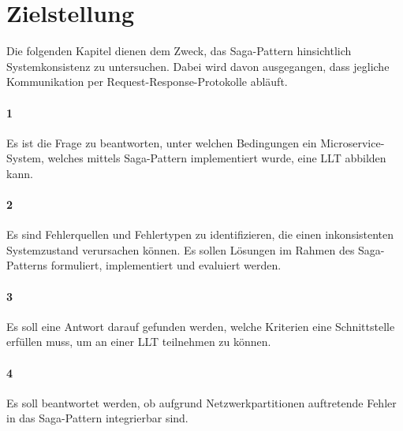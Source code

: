 
\section{Zielstellung}

Die folgenden Kapitel dienen dem Zweck, das Saga-Pattern hinsichtlich Systemkonsistenz zu untersuchen. Dabei wird davon ausgegangen, dass jegliche Kommunikation per Request-Response-Protokolle abläuft. 

\paragraph*{1}
Es ist die Frage zu beantworten, unter welchen Bedingungen ein Microservice-System, welches mittels Saga-Pattern implementiert wurde, eine LLT abbilden kann. 

\paragraph*{2}
Es sind Fehlerquellen und Fehlertypen zu identifizieren, die einen inkonsistenten Systemzustand verursachen können. Es sollen Lösungen im Rahmen des Saga-Patterns formuliert, implementiert und evaluiert werden. 

\paragraph*{3}
Es soll eine Antwort darauf gefunden werden, welche Kriterien eine Schnittstelle erfüllen muss, um an einer LLT teilnehmen zu können.

\paragraph*{4}
Es soll beantwortet werden, ob aufgrund Netzwerkpartitionen auftretende Fehler in das Saga-Pattern integrierbar sind. 



